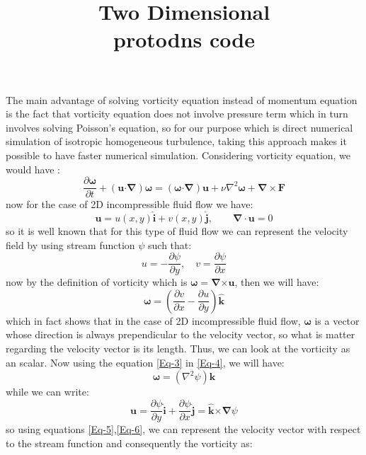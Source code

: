 \documentclass[10pt]{article}
\title{\huge{\textbf{Two Dimensional \\ \vspace{1cm} protodns code}}}
\author{}
\date{}
\def\dotp{\bm{\cdot}}
\def\crossp{\bm{\times}}
\def\grad{\bm{\nabla}}
\def\div{\bm{\nabla\cdot}}
\def\curl{\bm{\nabla\times}}
\def\lap{{\nabla}^2}
\def\F{\bm{F}}
\def\u{\bm{u}}
\def\OMEGA{\bm{\omega}}
\def\eI{\bm{\hat{i}}}
\def\eJ{\bm{\hat{j}}}
\def\eK{\bm{\hat{k}}}
\begin{document}
\maketitle
The main advantage of solving vorticity equation instead of momentum equation is the fact that vorticity equation does not involve pressure term which in turn involves solving Poisson's equation, so for our purpose which is direct numerical simulation of isotropic homogeneous turbulence, taking this approach makes it possible to have faster numerical simulation. Considering vorticity equation, we would have :
%
\begin{equation}\label{Eq-1-Vorticity}	
\frac{\partial{\OMEGA}}{\partial t} + (\u\dotp\grad)\OMEGA=(\OMEGA\dotp\grad)\u + \nu\lap\OMEGA + \curl\F
\end{equation}
%
now for the case of 2D incompressible fluid flow we have:
%
\begin{equation}\label{Eq-2}
\u=u(x,y)\eI+v(x,y)\eJ, \qquad \div\u=0
\end{equation}
%
so it is well known that for this type of fluid flow we can represent the velocity field by using stream function $\psi$ such that:
%
\begin{equation}\label{Eq-3}
u=-\frac{\partial\psi}{\partial y},\quad v=\frac{\partial\psi}{\partial x}
\end{equation}
%
now by the definition of vorticity which is $\OMEGA=\grad\crossp\u$, then we will have:
%
\begin{equation}\label{Eq-4}
\OMEGA=\left(\frac{\partial v}{\partial x}-\frac{\partial u}{\partial y}\right)\eK
\end{equation}
%
which in fact shows that in the case of 2D incompressible fluid flow, $\OMEGA$ is a vector whose direction is always prependicular to the velocity vector, so what is matter regarding the velocity vector is its length. Thus, we can look at the vorticity as an scalar. Now using the equation \eqref{Eq-3} in \eqref{Eq-4}, we will have:
%
\begin{equation}\label{Eq-5}
\OMEGA=(\lap\psi)\eK
\end{equation}
%
while we can write:
%
\begin{equation}\label{Eq-6}
\u=\frac{\partial\psi}{\partial y}\eI+\frac{\partial\psi}{\partial x}\eJ=\eK\crossp\grad\psi
\end{equation}
so using equations \eqref{Eq-5},\eqref{Eq-6}, we can represent the velocity vector with respect to the stream function and consequently the vorticity as:
\end{document}
